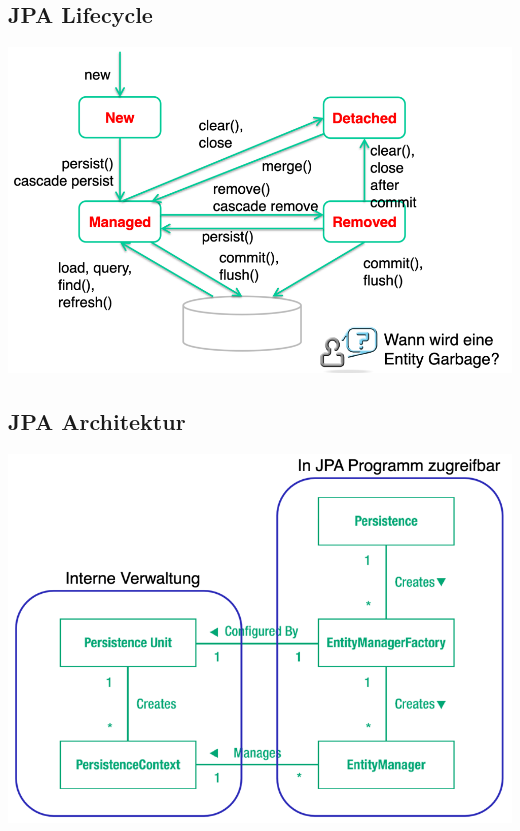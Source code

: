 \documentclass[a4paper, landscape, 8pt]{scrartcl}
\begin{document}
\begin{multicols*}{4}
        \subsection{JPA Lifecycle}
        \includegraphics[scale=0.12]{graphic/00-entity-lifecycle}

        \subsection{JPA Architektur}
        \includegraphics[scale=0.12]{graphic/01-jpa-architecture}


\end{multicols*}
\end{document}
